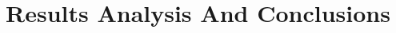 \documentclass[../main.tex]{subfiles}
\begin{document}
\chapter{Results Analysis And Conclusions}
\end{document}
